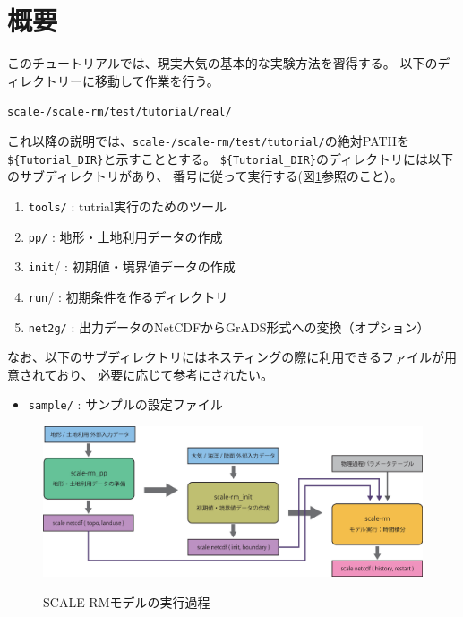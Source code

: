 \section{概要}
このチュートリアルでは、現実大気の基本的な実験方法を習得する。
以下のディレクトリーに移動して作業を行う。
\begin{alltt}
 scale-{\version}/scale-rm/test/tutorial/real/
\end{alltt}
これ以降の説明では、\texttt{scale-{\version}/scale-rm/test/tutorial/}の絶対PATHを
\verb|${Tutorial_DIR}|と示すこととする。
\verb|${Tutorial_DIR}|のディレクトリには以下のサブディレクトリがあり、
番号に従って実行する(図\ref{fig:howto}参照のこと）。
\begin{enumerate}
\item  \texttt{tools/}   : tutrial実行のためのツール
\item  \texttt{pp/}      : 地形・土地利用データの作成
\item  \texttt{init}/    : 初期値・境界値データの作成
\item  \texttt{run}/     : 初期条件を作るディレクトリ
\item  \texttt{net2g/}   : 出力データのNetCDFからGrADS形式への変換（オプション） 
\end{enumerate}
なお、以下のサブディレクトリにはネスティングの際に利用できるファイルが用意されており、
必要に応じて参考にされたい。
\begin{itemize}
\item  \texttt{sample/}  : サンプルの設定ファイル
\end{itemize}


\begin{figure}[b]
\begin{center}
  \includegraphics[width=0.9\hsize]{./figure/real_procedure.eps}\\
  \caption{SCALE-RMモデルの実行過程}
  \label{fig:howto}
\end{center}
\end{figure}

